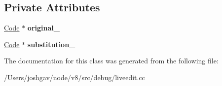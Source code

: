 \subsection*{Private Attributes}
\begin{DoxyCompactItemize}
\item 
\hyperlink{classv8_1_1internal_1_1_code}{Code} $\ast$ {\bfseries original\+\_\+}\hypertarget{classv8_1_1internal_1_1_replacing_visitor_a755ee6384887b52fd0859c6be7da70ae}{}\label{classv8_1_1internal_1_1_replacing_visitor_a755ee6384887b52fd0859c6be7da70ae}

\item 
\hyperlink{classv8_1_1internal_1_1_code}{Code} $\ast$ {\bfseries substitution\+\_\+}\hypertarget{classv8_1_1internal_1_1_replacing_visitor_a53b3e9c5cc072f01c1e6b99e871dcba7}{}\label{classv8_1_1internal_1_1_replacing_visitor_a53b3e9c5cc072f01c1e6b99e871dcba7}

\end{DoxyCompactItemize}


The documentation for this class was generated from the following file\+:\begin{DoxyCompactItemize}
\item 
/\+Users/joshgav/node/v8/src/debug/liveedit.\+cc\end{DoxyCompactItemize}
